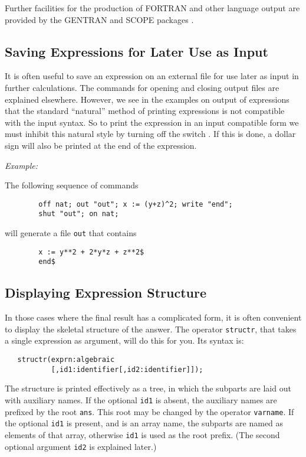 Further facilities for the production of FORTRAN and other language output
are provided by the GENTRAN and SCOPE packages
.

\subsection{Saving Expressions for Later Use as Input}
\hypertarget{switch:NAT}{}

It is often useful to save an expression on an external file for use later
as input in further calculations. The commands for opening and closing
output files are explained elsewhere. However, we see in the examples on
output of expressions that the standard ``natural'' method of printing
expressions is not compatible with the input syntax. So to print the
expression in an input compatible form we must inhibit this natural style
by turning off the switch . If this is done, a
dollar sign will also be printed at the end of the expression.

\textit{Example:}

The following sequence of commands
\begin{verbatim}
        off nat; out "out"; x := (y+z)^2; write "end";
        shut "out"; on nat;
\end{verbatim}
will generate a file \texttt{out} that contains
\begin{verbatim}
        x := y**2 + 2*y*z + z**2$
        end$
\end{verbatim}

\subsection{Displaying Expression Structure}
\hypertarget{operator:STRUCTR}{}

In those cases where the final result has a complicated form, it is often
convenient to display the skeletal structure of the answer.  The operator
\texttt{structr}, that takes a single expression as argument,
will do this for you.  Its syntax is:
\begin{verbatim}
   structr(exprn:algebraic
           [,id1:identifier[,id2:identifier]]);
\end{verbatim}
The structure is printed effectively as a tree, in which the subparts are
laid out with auxiliary names.  If the optional \texttt{id1} is absent, the
auxiliary names are prefixed by the root \texttt{ans}.  This root may be
changed by the operator \texttt{varname}.  If the
optional \texttt{id1} is present, and is an array name, the subparts are
named as elements of that array, otherwise \texttt{id1} is used as the root
prefix. (The second optional argument \texttt{id2} is explained later.)

